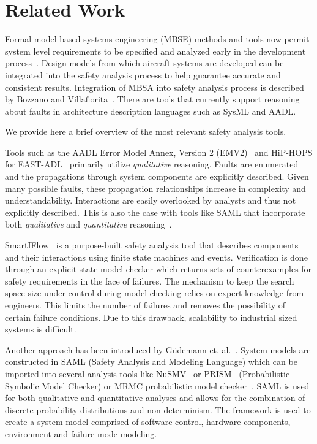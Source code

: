 \section{Related Work}
\label{sec:related_work}

Formal model based systems engineering (MBSE) methods and tools now permit system level requirements to be specified and analyzed early in the development process~\cite{QFCS15:backes,CIMATTI2015333, NFM2012:CoGaMiWhLaLu, hilt2013:MuWhRaHe}. Design models from which aircraft systems are developed can be integrated into the safety analysis process to help guarantee accurate and consistent results. Integration of MBSA into safety analysis process is described by Bozzano and Villafiorita~\cite{Bozzano:2010:DSA:1951720}. There are tools that currently support reasoning about faults in architecture description languages such as SysML and AADL. 

We provide here a brief overview of the most relevant safety analysis tools. 

Tools such as the AADL Error Model Annex, Version 2 (EMV2)~\cite{EMV2} and HiP-HOPS for EAST-ADL~\cite{CHEN201391} primarily utilize \textit{qualitative} reasoning. Faults are enumerated and the propagations through system components are explicitly described. Given many possible faults, these propagation relationships increase in complexity and understandability. Interactions are easily overlooked by analysts and thus not explicitly described. This is also the case with tools like SAML that incorporate both \textit{qualitative} and \textit{quantitative} reasoning~\cite{Gudemann:2010:FQQ:1909626.1909813}.


SmartIFlow~\cite{info8010007} is a purpose-built safety analysis tool that describes components and their interactions using finite state machines and events. Verification is done through an explicit state model checker which returns sets of counterexamples for safety requirements in the face of failures. The mechanism to keep the search space size under control during model checking relies on expert knowledge from engineers. This limits the number of failures and removes the possibility of certain failure conditions. Due to this drawback, scalability to industrial sized systems is difficult. 

Another approach has been introduced by Güdemann et. al.~\cite{Gudemann:2010:FQQ:1909626.1909813}. System models are constructed in SAML (Safety Analysis and Modeling Language) which can be imported into several analysis tools like NuSMV~\cite{Cimatti2000} or PRISM~\cite{CAV2011:KwNoPa} (Probabilistic Symbolic Model Checker) or MRMC probabilistic model checker~\cite{Katoen:2005:MRM:1114692.1115230}. SAML is used for both qualitative and quantitative analyses and allows for the combination of discrete probability distributions and non-determinism. The framework is used to create a system model comprised of software control, hardware components, environment and failure mode modeling. 

